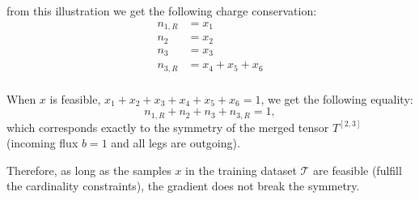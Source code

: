 from this illustration we get the following charge conservation:
\begin{align}
    n_{1,R}&=x_1 \\
    n_2&=x_2\\
    n_3&=x_3\\
    n_{3,R}&=x_4+x_5+x_6\\
\end{align}

When $x$ is feasible, $x_1+x_2+x_3+x_4+x_5+x_6=1$, we get the following equality:
\begin{equation}
    n_{1,R}+n_2+n_3+n_{3,R}=1,
\end{equation}
which corresponds exactly to the symmetry of the merged tensor $T^{[2,3]}$ (incoming flux $b=1$ and all legs are outgoing).

Therefore, as long as the samples $x$ in the training dataset $\mathcal T$ are feasible (fulfill the cardinality constraints), the gradient does not break the symmetry.
